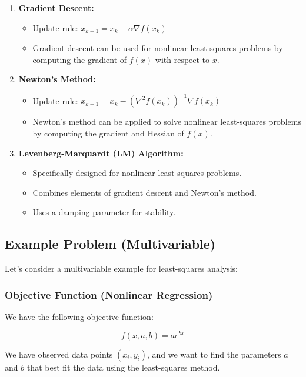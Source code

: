 \documentclass[a4paper]{article}
\begin{document}
\begin{enumerate}
    \item \textbf{Gradient Descent:}
    \begin{itemize}
        \item Update rule: $x_{k+1} = x_k - \alpha \nabla f(x_k)$
        \item Gradient descent can be used for nonlinear least-squares problems by computing the gradient of $f(x)$ with respect to $x$.
    \end{itemize}
    
    \item \textbf{Newton's Method:}
    \begin{itemize}
        \item Update rule: $x_{k+1} = x_k - \left(\nabla^2 f(x_k)\right)^{-1} \nabla f(x_k)$
        \item Newton's method can be applied to solve nonlinear least-squares problems by computing the gradient and Hessian of $f(x)$.
    \end{itemize}
    
    \item \textbf{Levenberg-Marquardt (LM) Algorithm:}
    \begin{itemize}
        \item Specifically designed for nonlinear least-squares problems.
        \item Combines elements of gradient descent and Newton's method.
        \item Uses a damping parameter for stability.
    \end{itemize}
\end{enumerate}

\subsection{Example Problem (Multivariable)}

Let's consider a multivariable example for least-squares analysis:

\subsubsection{Objective Function (Nonlinear Regression)}

We have the following objective function:

\[
f(x, a, b) = a e^{bx}
\]

We have observed data points $(x_i, y_i)$, and we want to find the parameters $a$ and $b$ that best fit the data using the least-squares method.
\end{document}
